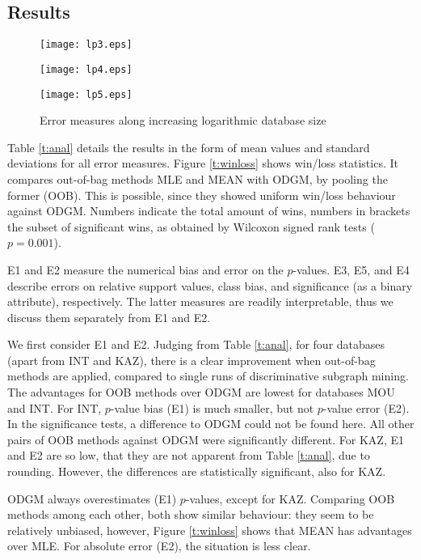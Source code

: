\documentclass{sig-alternate}
\begin{document}
\subsection{Results}

\label{ss:Results}
\begin{figure*}[t]
  \begin{minipage}[h]{5.5cm}
    \texttt{[image: lp3.eps]}
  \end{minipage}
  \begin{minipage}[h]{5.5cm}
    \texttt{[image: lp4.eps]}
  \end{minipage}
  \begin{minipage}[h]{5.5cm}
    \texttt{[image: lp5.eps]}
  \end{minipage}
  \caption{Error measures along increasing logarithmic database size}
  \label{fig:lp}
\end{figure*}
Table \ref{t:anal} details the results in the form of mean values and standard
deviations for all error measures. 
Figure
\ref{t:winloss} shows win/loss statistics. It compares out-of-bag methods MLE
and MEAN with ODGM, by pooling the former (OOB). This is possible, since they
showed uniform win/loss behaviour against ODGM.
Numbers indicate the total amount of wins, numbers in brackets the
subset of significant wins, as obtained by Wilcoxon signed rank tests ($p=0.001$).

E1 and E2 measure the numerical bias and error on the $p$-values. E3, E5, and E4 describe errors on
relative support values, class bias, and significance (as a binary attribute),
respectively. The latter measures are readily interpretable, thus we discuss
them separately from E1 and E2.

We first consider E1 and E2. Judging from Table \ref{t:anal}, for four databases
(apart from INT and KAZ), there is a clear improvement when out-of-bag
methods are applied, compared to single runs of discriminative
subgraph mining. The advantages for OOB methods over ODGM are lowest for databases MOU and INT.
For INT, $p$-value bias (E1)
is much smaller, but not $p$-value error (E2). In the significance
tests, a difference to ODGM could not be found here. All other pairs of OOB 
methods against ODGM were significantly different. For KAZ, E1 and
E2 are so low, that they are not apparent from Table \ref{t:anal}, due to rounding. However,
the differences are statistically significant, also for KAZ.

ODGM always overestimates (E1) $p$-values, except for KAZ. 
Comparing OOB methods among each other, both show
similar behaviour: they seem to be relatively
unbiased, however, Figure \ref{t:winloss} shows that MEAN has
advantages over MLE. For absolute error (E2), the situation is less clear. 
\end{document}
